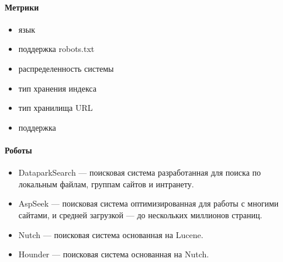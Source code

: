 \paragraph{Метрики}
\begin{itemize}
 \item язык
 \item поддержка robots.txt
 \item распределенность системы
 \item тип хранения индекса
 \item тип хранилища URL
 \item поддержка
\end{itemize}
\paragraph{Роботы}
\begin{itemize}
 \item DataparkSearch --- поисковая система разработанная для поиска по локальным файлам, группам сайтов и интранету.
 \item AspSeek --- поисковая система оптимизированная для работы с многими сайтами, и средней загрузкой --- до нескольких миллионов страниц.
 \item Nutch --- поисковая система основанная на Lucene.
 \item Hounder --- поисковая система основанная на Nutch.
\end{itemize}

